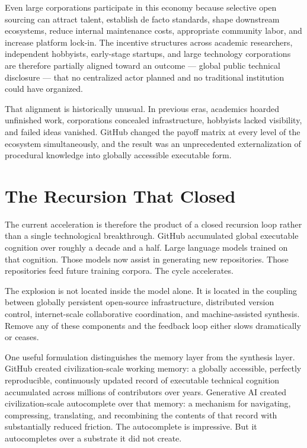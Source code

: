 \documentclass[12pt]{article}
\begin{document}
Even large corporations participate in this economy because selective open
sourcing can attract talent, establish de facto standards, shape downstream
ecosystems, reduce internal maintenance costs, appropriate community labor, and
increase platform lock-in. The incentive structures across academic researchers,
independent hobbyists, early-stage startups, and large technology corporations
are therefore partially aligned toward an outcome --- global public technical
disclosure --- that no centralized actor planned and no traditional institution
could have organized.

That alignment is historically unusual. In previous eras, academics hoarded
unfinished work, corporations concealed infrastructure, hobbyists lacked
visibility, and failed ideas vanished. GitHub changed the payoff matrix at every
level of the ecosystem simultaneously, and the result was an unprecedented
externalization of procedural knowledge into globally accessible executable form.

\section{The Recursion That Closed}

The current acceleration is therefore the product of a closed recursion loop
rather than a single technological breakthrough. GitHub accumulated global
executable cognition over roughly a decade and a half. Large language models
trained on that cognition. Those models now assist in generating new
repositories. Those repositories feed future training corpora. The cycle
accelerates.

The explosion is not located inside the model alone. It is located in the
coupling between globally persistent open-source infrastructure, distributed
version control, internet-scale collaborative coordination, and machine-assisted
synthesis. Remove any of these components and the feedback loop either slows
dramatically or ceases.

One useful formulation distinguishes the memory layer from the synthesis layer.
GitHub created civilization-scale working memory: a globally accessible,
perfectly reproducible, continuously updated record of executable technical
cognition accumulated across millions of contributors over years. Generative AI
created civilization-scale autocomplete over that memory: a mechanism for
navigating, compressing, translating, and recombining the contents of that record
with substantially reduced friction. The autocomplete is impressive. But it
autocompletes over a substrate it did not create.
\end{document}
